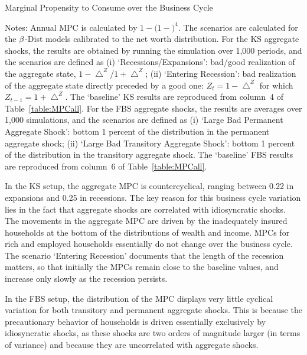 \documentclass[12pt,titlepage]{econtex}
\renewcommand{\ptyLev}{\ensuremath{Z}} %
\newcommand{\tablenotessize}[1]{\footnotesize{#1}} %
\begin{document}
\begin{table}
\caption{Marginal Propensity to Consume over the Business Cycle}
\label{table:MPCscenarios}
\begin{minipage}{\textwidth}

\tablenotessize{Notes: Annual MPC is calculated by $1-(1-$\text{quarterly MPC}$)^{4}$. The scenarios
 are calculated for the $\beta$-Dist models calibrated to the net worth distribution. For the KS aggregate shocks, the results are obtained by running the simulation over 1,000 periods, and the scenarios are defined as (i) `Recessions/Expansions': bad/good realization of the aggregate state, $1-\bigtriangleup ^{\ptyLev}$/$1+\bigtriangleup ^{\ptyLev}$; (ii) `Entering Recession': bad realization of the aggregate state directly preceded by a good one: $\ptyLev_{t}=1-\bigtriangleup ^{\ptyLev}$ for which $\ptyLev_{t-1}=1+\bigtriangleup ^{\ptyLev}$. The `baseline' KS results are reproduced from column~4 of Table~\ref{table:MPCall}. For the FBS aggregate shocks, the results are averages over 1,000 simulations, and the scenarios are defined as (i) `Large Bad Permanent Aggregate Shock': bottom 1 percent of the distribution in the permanent aggregate shock; (ii) `Large Bad Transitory Aggregate Shock': bottom 1 percent of the distribution in the transitory aggregate shock. The `baseline' FBS results are reproduced from column~6 of Table~\ref{table:MPCall}.}
\end{minipage}
\end{table}

In the KS setup, the aggregate MPC is countercyclical, ranging between 0.22 in expansions and 0.25 in recessions. The key reason for this business cycle variation lies in the fact that aggregate shocks are correlated with idiosyncratic shocks. The movements in the aggregate MPC are driven by the inadequately insured households at the bottom of the distributions of wealth and income. MPCs for rich and employed households essentially do not change over the business cycle. The scenario `Entering Recession' documents that the length of the recession matters, so that initially the MPCs remain close to the baseline values, and increase only slowly as the recession persists.

In the FBS setup, the distribution of the MPC displays very little cyclical variation for both transitory and permanent aggregate shocks. This is because the precautionary behavior of households is driven essentially exclusively by idiosyncratic shocks, as these shocks are two orders of magnitude larger (in terms of variance) and because they are uncorrelated with aggregate shocks.
\end{document}
